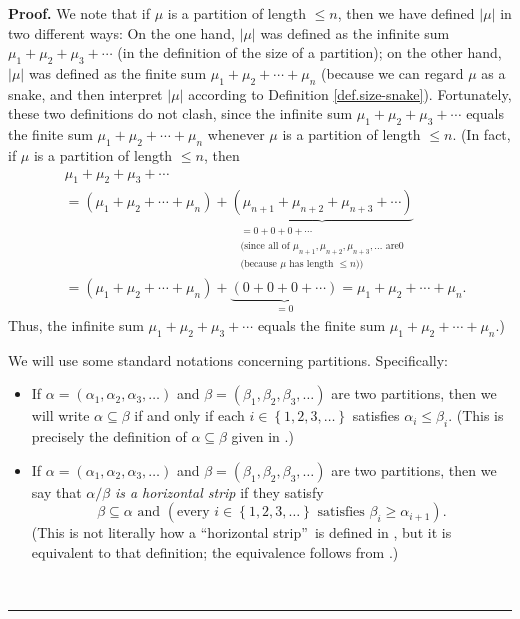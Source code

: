 \documentclass[numbers=enddot,12pt,final,onecolumn,notitlepage]{scrartcl}%
\theoremstyle{definition}
\newenvironment{proof}[1][Proof]{\noindent\textbf{#1.} }{\ \rule{0.5em}{0.5em}}
\newenvironment{verlong}{}{}
\begin{document}
\begin{proof}
\begin{verlong}
We note that if $\mu$ is a partition of length $\leq n$, then we have defined
$\left\vert \mu\right\vert $ in two different ways: On the one hand,
$\left\vert \mu\right\vert $ was defined as the infinite sum $\mu_{1}+\mu
_{2}+\mu_{3}+\cdots$ (in the definition of the size of a partition); on the
other hand, $\left\vert \mu\right\vert $ was defined as the finite sum
$\mu_{1}+\mu_{2}+\cdots+\mu_{n}$ (because we can regard $\mu$ as a snake, and
then interpret $\left\vert \mu\right\vert $ according to Definition
\ref{def.size-snake}). Fortunately, these two definitions do not clash, since
the infinite sum $\mu_{1}+\mu_{2}+\mu_{3}+\cdots$ equals the finite sum
$\mu_{1}+\mu_{2}+\cdots+\mu_{n}$ whenever $\mu$ is a partition of length $\leq
n$. (In fact, if $\mu$ is a partition of length $\leq n$, then
\begin{align*}
&  \mu_{1}+\mu_{2}+\mu_{3}+\cdots\\
&  =\left(  \mu_{1}+\mu_{2}+\cdots+\mu_{n}\right)  +\underbrace{\left(
\mu_{n+1}+\mu_{n+2}+\mu_{n+3}+\cdots\right)  }_{\substack{=0+0+0+\cdots
\\\text{(since all of }\mu_{n+1},\mu_{n+2},\mu_{n+3},\ldots\text{ are
}0\\\text{(because }\mu\text{ has length }\leq n\text{))}}}\\
&  =\left(  \mu_{1}+\mu_{2}+\cdots+\mu_{n}\right)  +\underbrace{\left(
0+0+0+\cdots\right)  }_{=0}=\mu_{1}+\mu_{2}+\cdots+\mu_{n}.
\end{align*}
Thus, the infinite sum $\mu_{1}+\mu_{2}+\mu_{3}+\cdots$ equals the finite sum
$\mu_{1}+\mu_{2}+\cdots+\mu_{n}$.)
\end{verlong}

We will use some standard notations concerning partitions. Specifically:

\begin{itemize}
\item If $\alpha=\left(  \alpha_{1},\alpha_{2},\alpha_{3},\ldots\right)  $ and
$\beta=\left(  \beta_{1},\beta_{2},\beta_{3},\ldots\right)  $ are two
partitions, then we will write $\alpha\subseteq\beta$ if and only if each
$i\in\left\{  1,2,3,\ldots\right\}  $ satisfies $\alpha_{i}\leq\beta_{i}$.
(This is precisely the definition of $\alpha\subseteq\beta$ given in
\cite[Definition 2.3.1]{GriRei}.)

\item If $\alpha=\left(  \alpha_{1},\alpha_{2},\alpha_{3},\ldots\right)  $ and
$\beta=\left(  \beta_{1},\beta_{2},\beta_{3},\ldots\right)  $ are two
partitions, then we say that $\alpha/\beta$ \emph{is a horizontal strip} if
they satisfy
\[
\beta\subseteq\alpha\text{ and }\left(  \text{every }i\in\left\{
1,2,3,\ldots\right\}  \text{ satisfies }\beta_{i}\geq\alpha_{i+1}\right)  .
\]
(This is not literally how a \textquotedblleft horizontal
strip\textquotedblright\ is defined in \cite{GriRei}, but it is equivalent to
that definition; the equivalence follows from \cite[Exercise 2.7.5(a)]{GriRei}.)


\end{itemize}
\end{proof}
\end{document}
